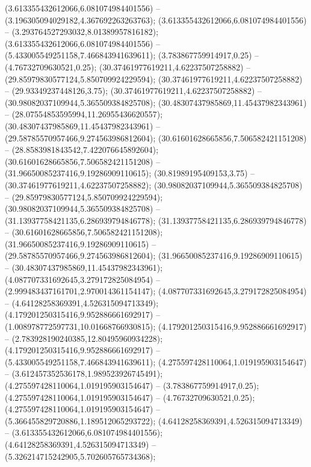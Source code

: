  (3.613355432612066,6.081074984401556) -- (3.196305094029182,4.367692263263763);
 (3.613355432612066,6.081074984401556) -- (3.293764527293032,8.01389957816182);
 (3.613355432612066,6.081074984401556) -- (5.433005549251158,7.466843941639611);
 (3.783867759914917,0.25) -- (4.76732709630521,0.25);
 (30.37461977619211,4.62237507258882) -- (29.85979830577124,5.850709924229594);
 (30.37461977619211,4.62237507258882) -- (29.93349237448126,3.75);
 (30.37461977619211,4.62237507258882) -- (30.98082037109944,5.365509384825708);
 (30.48307437985869,11.45437982343961) -- (28.07554853595994,11.26955436620557);
 (30.48307437985869,11.45437982343961) -- (29.58785570957466,9.274563986812604);
 (30.61601628665856,7.506582421151208) -- (28.8583981843542,7.422076645892604);
 (30.61601628665856,7.506582421151208) -- (31.96650085237416,9.19286909110615);
 (30.81989195409153,3.75) -- (30.37461977619211,4.62237507258882);
 (30.98082037109944,5.365509384825708) -- (29.85979830577124,5.850709924229594);
 (30.98082037109944,5.365509384825708) -- (31.13937758421135,6.286939794846778);
 (31.13937758421135,6.286939794846778) -- (30.61601628665856,7.506582421151208);
 (31.96650085237416,9.19286909110615) -- (29.58785570957466,9.274563986812604);
 (31.96650085237416,9.19286909110615) -- (30.48307437985869,11.45437982343961);
 (4.087707331692645,3.279172825084954) -- (2.999483437161701,2.970014361154147);
 (4.087707331692645,3.279172825084954) -- (4.64128258369391,4.526315094713349);
 (4.179201250315416,9.952886661692917) -- (1.008978772597731,10.01668766930815);
 (4.179201250315416,9.952886661692917) -- (2.783928190240385,12.80495960934228);
 (4.179201250315416,9.952886661692917) -- (5.433005549251158,7.466843941639611);
 (4.275597428110064,1.019195903154647) -- (3.612457352536178,1.989523926745491);
 (4.275597428110064,1.019195903154647) -- (3.783867759914917,0.25);
 (4.275597428110064,1.019195903154647) -- (4.76732709630521,0.25);
 (4.275597428110064,1.019195903154647) -- (5.366455829720886,1.189512065293722);
 (4.64128258369391,4.526315094713349) -- (3.613355432612066,6.081074984401556);
 (4.64128258369391,4.526315094713349) -- (5.326214715242905,5.702605765734368);
